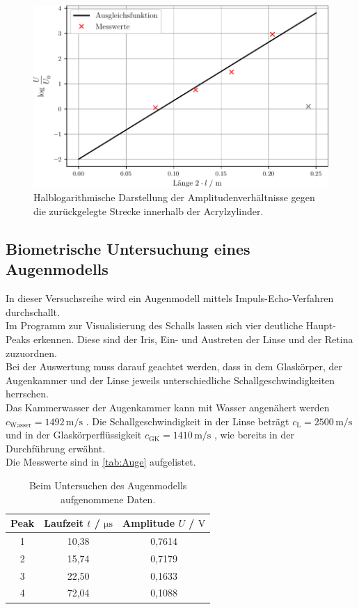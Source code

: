   \begin{figure}
    \centering
    \includegraphics[width=15cm]{messwerte/Daempfung.pdf}
    \caption{Halblogarithmische Darstellung der Amplitudenverhältnisse gegen die zurückgelegte Strecke innerhalb der Acrylzylinder.}
    \label{fig:Daempfung}
  \end{figure}

\subsection{Biometrische Untersuchung eines Augenmodells}

  In dieser Versuchsreihe wird ein Augenmodell mittels Impuls-Echo-Verfahren durchschallt.\\ 
  Im Programm zur Visualisierung des Schalls lassen sich vier deutliche Haupt-Peaks erkennen.
  Diese sind der Iris, Ein- und Austreten der Linse und der Retina zuzuordnen.\\
  Bei der Auswertung muss darauf geachtet werden, dass in dem Glaskörper, der Augenkammer und der 
  Linse jeweils unterschiedliche Schallgeschwindigkeiten herrschen.\\
  Das Kammerwasser der Augenkammer kann mit Wasser angenähert werden $c_{\mathrm{Wasser}} = 1492 \, \si{\meter\per\second}$  \cite{medizinphysik}.
  Die Schallgeschwindigkeit in der Linse beträgt $c_{\mathrm{L}} = 2500 \, \si{\meter\per\second}$ und in der
  Glaskörperflüssigkeit $c_{\mathrm{GK}} = 1410 \, \si{\meter\per\second}$ \cite{sample}, wie bereits in der Durchführung erwähnt.\\
  Die Messwerte sind in \autoref{tab:Auge} aufgelistet.

  \begin{table}
    \centering
    \caption{Beim Untersuchen des Augenmodells aufgenommene Daten.}
    \label{tab:Auge}
    \begin{tabular}{c | c c}
      Peak & Laufzeit $t$ / $\si{\micro\second}$ & Amplitude $U$ / $\si{\volt}$ \\
        \midrule
        1   & 10,38 & 0,7614\\
        2   & 15,74 & 0,7179\\
        3   & 22,50 & 0,1633\\
        4   & 72,04 & 0,1088\\
        \bottomrule
      \end{tabular}
  \end{table}


